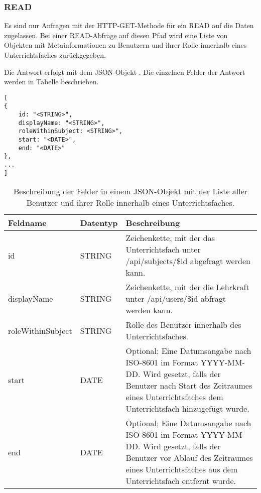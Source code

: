\subsubsection{READ}
\label{secrest:api:subjects:id:users:read}
Es sind nur Anfragen mit der HTTP-GET-Methode für ein READ auf die Daten zugelassen.
Bei einer READ-Abfrage auf diesen Pfad wird eine Liste von Objekten mit Metainformationen zu Benutzern und ihrer Rolle innerhalb eines Unterrichtsfaches zurückgegeben.

Die Antwort erfolgt mit dem JSON-Objekt . 
Die einzelnen Felder der Antwort werden in Tabelle  beschrieben.

\begin{lstlisting}[caption={JSON-Antwort für einen GET-Aufruf des Pfads /api/subjects/\$id/users},label={lst:code:rest:api:subjects:id:users:read:ret},frame=tlrb]
[
{
    id: "<STRING>",
    displayName: "<STRING>",
    roleWithinSubject: <STRING>",
    start: "<DATE>",
    end: "<DATE>"    
},
...
]
\end{lstlisting}
\begin{longtable}{|p{}|p{}|p{}|}
		\caption{Beschreibung der Felder in einem JSON-Objekt mit der Liste aller Benutzer und ihrer Rolle innerhalb eines Unterrichtsfaches.}
\endfoot
		\caption{Beschreibung der Felder in einem JSON-Objekt mit der Liste aller Benutzer und ihrer Rolle innerhalb eines Unterrichtsfaches.}
		\label{tab:rest:api:subjects:id:users:read:ret:json}
\endlastfoot 
\hline
			\textbf{Feldname} & \textbf{Datentyp} & \textbf{Beschreibung} \\ \hline
\endhead
id & STRING & Zeichenkette, mit der das Unterrichtsfach unter /api/subjects/\$id abgefragt werden kann. \\ \hline
displayName & STRING &  Zeichenkette, mit der die Lehrkraft unter /api/users/\$id abfragt werden kann. \\ \hline
roleWithinSubject & STRING & Rolle des Benutzer innerhalb des Unterrichtsfaches. \\ \hline
start & DATE & Optional; Eine Datumsangabe nach ISO-8601 im Format YYYY-MM-DD. Wird gesetzt, falls der Benutzer nach Start des Zeitraumes eines Unterrichtsfaches dem Unterrichtsfach hinzugefügt wurde. \\ \hline
end & DATE & Optional; Eine Datumsangabe nach ISO-8601 im Format YYYY-MM-DD. Wird gesetzt, falls der Benutzer vor Ablauf des Zeitraumes eines Unterrichtsfaches aus dem Unterrichtsfach entfernt wurde. \\ \hline
\end{longtable}
